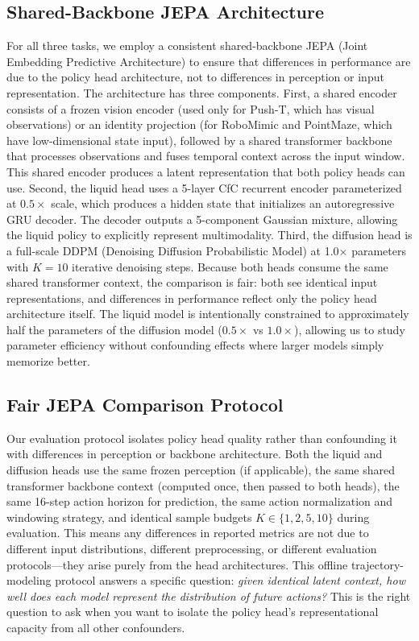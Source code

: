\documentclass{article}
\begin{document}
\subsection{Shared-Backbone JEPA Architecture}
For all three tasks, we employ a consistent shared-backbone JEPA (Joint Embedding Predictive Architecture) to ensure that differences in performance are due to the policy head architecture, not to differences in perception or input representation. The architecture has three components. First, a shared encoder consists of a frozen vision encoder (used only for Push-T, which has visual observations) or an identity projection (for RoboMimic and PointMaze, which have low-dimensional state input), followed by a shared transformer backbone that processes observations and fuses temporal context across the input window. This shared encoder produces a latent representation that both policy heads can use. Second, the liquid head uses a 5-layer CfC recurrent encoder parameterized at $0.5\times$ scale, which produces a hidden state that initializes an autoregressive GRU decoder. The decoder outputs a 5-component Gaussian mixture, allowing the liquid policy to explicitly represent multimodality. Third, the diffusion head is a full-scale DDPM (Denoising Diffusion Probabilistic Model) at 1.0$\times$ parameters with $K=10$ iterative denoising steps. Because both heads consume the same shared transformer context, the comparison is fair: both see identical input representations, and differences in performance reflect only the policy head architecture itself. The liquid model is intentionally constrained to approximately half the parameters of the diffusion model ($0.5\times$ vs $1.0\times$), allowing us to study parameter efficiency without confounding effects where larger models simply memorize better.

\subsection{Fair JEPA Comparison Protocol}
Our evaluation protocol isolates policy head quality rather than confounding it with differences in perception or backbone architecture. Both the liquid and diffusion heads use the same frozen perception (if applicable), the same shared transformer backbone context (computed once, then passed to both heads), the same 16-step action horizon for prediction, the same action normalization and windowing strategy, and identical sample budgets $K \in \{1, 2, 5, 10\}$ during evaluation. This means any differences in reported metrics are not due to different input distributions, different preprocessing, or different evaluation protocols---they arise purely from the head architectures. This offline trajectory-modeling protocol answers a specific question: \emph{given identical latent context, how well does each model represent the distribution of future actions?} This is the right question to ask when you want to isolate the policy head's representational capacity from all other confounders.
\end{document}
